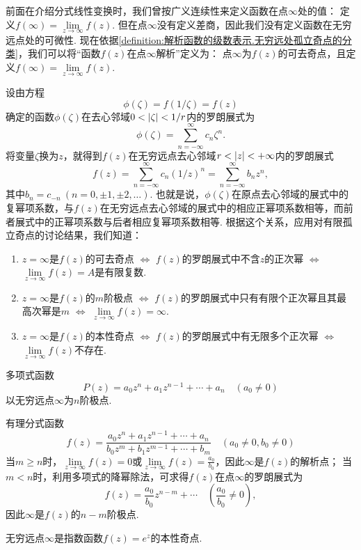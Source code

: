 前面在介绍分式线性变换时，我们曾按广义连续性来定义函数在点\(\infty\)处的值：
定义\(f(\infty) = \lim\limits_{z\to\infty} f(z)\).
但在点\(\infty\)没有定义差商，因此我们没有定义函数在无穷远点处的可微性.
现在依据\cref{definition:解析函数的级数表示.无穷远处孤立奇点的分类}，我们可以将“函数\(f(z)\)在点\(\infty\)解析”定义为：
点\(\infty\)为\(f(z)\)的可去奇点，且定义\(f(\infty) = \lim\limits_{z\to\infty} f(z)\).

设由方程\[
\phi(\zeta) = f(1/\zeta) = f(z)
\]确定的函数\(\phi(\zeta)\)在去心邻域\(0<\abs{\zeta}<1/r\)内的罗朗展式为\[
\phi(\zeta) = \sum\limits_{n=-\infty}^\infty c_n \zeta^n.
\]将变量\(\zeta\)换为\(z\)，就得到\(f(z)\)在无穷远点去心邻域\(r<\abs{z}<+\infty\)内的罗朗展式\[
f(z) = \sum\limits_{n=-\infty}^\infty c_n (1/z)^n
= \sum\limits_{n=-\infty}^\infty b_n z^n,
\]其中\(b_n = c_{-n}\ (n=0,\pm1,\pm2,\dotsc)\).
也就是说，\(\phi(\zeta)\)在原点去心邻域的展式中的复幂项系数，与\(f(z)\)在无穷远点去心邻域的展式中的相应正幂项系数相等，而前者展式中的正幂项系数与后者相应复幂项系数相等.
根据这个关系，应用对有限孤立奇点的讨论结果，我们知道：
\begin{enumerate}
\item \(z=\infty\)是\(f(z)\)的可去奇点 \(\iff\) \(f(z)\)的罗朗展式中不含\(z\)的正次幂 \(\iff\) \(\lim\limits_{z\to\infty} f(z) = A\)是有限复数.
\item \(z=\infty\)是\(f(z)\)的\(m\)阶极点 \(\iff\) \(f(z)\)的罗朗展式中只有有限个正次幂且其最高次幂是\(m\) \(\iff\) \(\lim\limits_{z\to\infty} f(z) = \infty\).
\item \(z=\infty\)是\(f(z)\)的本性奇点 \(\iff\) \(f(z)\)的罗朗展式中有无限多个正次幂 \(\iff\) \(\lim\limits_{z\to\infty} f(z)\)不存在.
\end{enumerate}

\begin{example}
多项式函数\[
P(z) = a_0 z^n + a_1 z^{n-1} + \dotsb + a_n
\quad(a_0\neq0)
\]以无穷远点\(\infty\)为\(n\)阶极点.
\end{example}

\begin{example}
有理分式函数\[
f(z) = \frac{a_0 z^n + a_1 z^{n-1} + \dotsb + a_n}{b_0 z^m + b_1 z^{m-1} + \dotsb + b_m}
\quad(a_0\neq0,b_0\neq0)
\]当\(m \geq n\)时，\(\lim\limits_{z\to\infty} f(z) = 0\)或\(\lim\limits_{z\to\infty} f(z) = \frac{a_0}{b_0}\)，因此\(\infty\)是\(f(z)\)的解析点；
当\(m<n\)时，利用多项式的降幂除法，可求得\(f(z)\)在点\(\infty\)的罗朗展式为\[
f(z) = \frac{a_0}{b_0} z^{n-m} + \dotsb
\quad(\frac{a_0}{b_0}\neq0),
\]因此\(\infty\)是\(f(z)\)的\(n-m\)阶极点.
\end{example}

\begin{example}
无穷远点\(\infty\)是指数函数\(f(z) = e^z\)的本性奇点.
\end{example}
